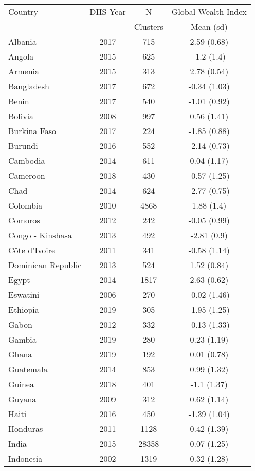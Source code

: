 \begin{tabular}{l ccc} 
\hline 
Country & DHS Year & N        & Global Wealth Index \\ 
        &          & Clusters & Mean (sd) \\ 
\hline 
Albania & 2017 & 715 & 2.59 (0.68)  \\ 
 Angola & 2015 & 625 & -1.2 (1.4)  \\ 
 Armenia & 2015 & 313 & 2.78 (0.54)  \\ 
 Bangladesh & 2017 & 672 & -0.34 (1.03)  \\ 
 Benin & 2017 & 540 & -1.01 (0.92)  \\ 
 Bolivia & 2008 & 997 & 0.56 (1.41)  \\ 
 Burkina Faso & 2017 & 224 & -1.85 (0.88)  \\ 
 Burundi & 2016 & 552 & -2.14 (0.73)  \\ 
 Cambodia & 2014 & 611 & 0.04 (1.17)  \\ 
 Cameroon & 2018 & 430 & -0.57 (1.25)  \\ 
 Chad & 2014 & 624 & -2.77 (0.75)  \\ 
 Colombia & 2010 & 4868 & 1.88 (1.4)  \\ 
 Comoros & 2012 & 242 & -0.05 (0.99)  \\ 
 Congo - Kinshasa & 2013 & 492 & -2.81 (0.9)  \\ 
 Côte d’Ivoire & 2011 & 341 & -0.58 (1.14)  \\ 
 Dominican Republic & 2013 & 524 & 1.52 (0.84)  \\ 
 Egypt & 2014 & 1817 & 2.63 (0.62)  \\ 
 Eswatini & 2006 & 270 & -0.02 (1.46)  \\ 
 Ethiopia & 2019 & 305 & -1.95 (1.25)  \\ 
 Gabon & 2012 & 332 & -0.13 (1.33)  \\ 
 Gambia & 2019 & 280 & 0.23 (1.19)  \\ 
 Ghana & 2019 & 192 & 0.01 (0.78)  \\ 
 Guatemala & 2014 & 853 & 0.99 (1.32)  \\ 
 Guinea & 2018 & 401 & -1.1 (1.37)  \\ 
 Guyana & 2009 & 312 & 0.62 (1.14)  \\ 
 Haiti & 2016 & 450 & -1.39 (1.04)  \\ 
 Honduras & 2011 & 1128 & 0.42 (1.39)  \\ 
 India & 2015 & 28358 & 0.07 (1.25)  \\ 
 Indonesia & 2002 & 1319 & 0.32 (1.28)  \\ 

\end{tabular}
